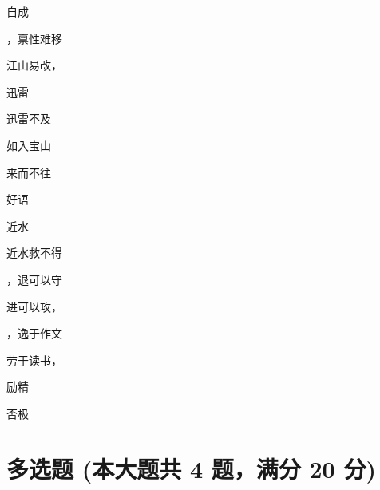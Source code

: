 \documentclass[12pt, a4paper, addpoints, answers]{exam}
\begin{document}
\begin{multicols}{2}
\begin{questions}
\question[2] 

\question[2] 自成

\question[2] ，禀性难移

\question[2] 江山易改，

\question[2] 

\question[2] 迅雷

\question[2] 迅雷不及

\question[2] 

\question[2] 如入宝山

\question[2] 

\question[2] 来而不往

\question[2] 

\question[2] 

\question[2] 好语

\question[2] 

\question[2] 近水

\question[2] 近水救不得

\question[2] ，退可以守

\question[2] 进可以攻，

\question[2] ，逸于作文

\question[2] 劳于读书，

\question[2] 

\question[2] 励精

\question[2] 

\question[2] 否极

\end{questions}
\end{multicols}

\hspace{5cm}

\section{\normalsize{多选题 (本大题共 4 题，满分 20 分)}}
\hspace{1.5cm}
\end{document}
